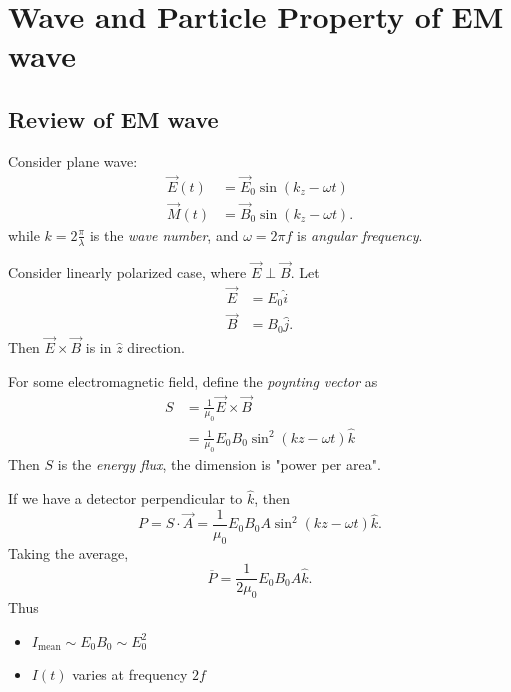 \section{Wave and Particle Property of EM wave}

\subsection{Review of EM wave}

Consider plane wave: \begin{align*}
	\vec{E} (t) &= \vec{E} _0 \sin\left( k_z - \omega t \right) \\
	\vec{M} (t) &= \vec{B} _0 \sin\left( k_z - \omega t \right) 
.\end{align*} 
while $k = 2 \frac{\pi}{\lambda}$ is the \textit{wave number}, and $\omega = 2 \pi f$ is \textit{angular frequency}.

Consider linearly polarized case, where $\vec{E} \perp \vec{B} $. Let
\begin{align*}
	\vec{E}  &= E_0 \hat{i}  \\
	\vec{B}  &= B_0 \hat{j} 
.\end{align*}
Then $\vec{E} \times \vec{B} $ is in $\hat{z} $ direction.

\begin{definition}
	For some electromagnetic field, define the \textit{poynting vector} as
	\begin{align*}
		S &= \frac{1}{\mu_0}\vec{E} \times \vec{B}\\
		&= \frac{1}{\mu_0}E_0B_0 \sin^2(kz - \omega t)\hat{k}
	\end{align*}
	Then $S$ is the \textit{energy flux}, the dimension is "power per area".  
\end{definition}

If we have a detector perpendicular to $\hat{k} $, then
\[
	P = S \cdot \vec{A} = \frac{1}{\mu_0}E_0B_0 A\sin^2(kz - \omega t)\hat{k}
.\] 
Taking the average,
\[
	\overline{P}  =  \frac{1}{2\mu_0}E_0B_0 A\hat{k}
.\] 
Thus
\begin{itemize}
	\item $I_{\text{mean}} \sim E_0B_0\sim E_0^2$
	\item $I(t)$ varies at frequency $2f$
\end{itemize}
